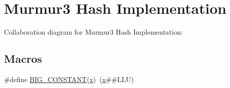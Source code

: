 \hypertarget{group__hash__murmur3}{}\section{Murmur3 Hash Implementation}
\label{group__hash__murmur3}
Collaboration diagram for Murmur3 Hash Implementation\+:
\subsection*{Macros}
\begin{DoxyCompactItemize}
\item 
\#define \hyperlink{group__hash__murmur3_ga8e0f90a6ea3d3db65033b8ace70cb65a}{B\+I\+G\+\_\+\+C\+O\+N\+S\+T\+A\+NT}(\hyperlink{lte__link__budget__x2__handover__measures_8m_a9336ebf25087d91c818ee6e9ec29f8c1}{x})~(\hyperlink{lte__link__budget__x2__handover__measures_8m_a9336ebf25087d91c818ee6e9ec29f8c1}{x}\#\#L\+LU)
\end{DoxyCompactItemize}

